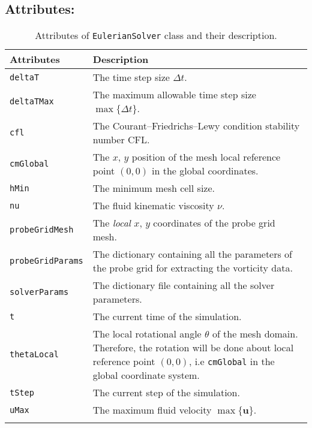 \subsection*{Attributes:}
\begingroup
\footnotesize
\begin{longtable}{|l|p{11cm}|}
	\hline
	\textbf{Attributes} & \textbf{Description}\\
	\toprule
    \texttt{deltaT} 		& The time step size $\Delta t$. \\ \hline
    \texttt{deltaTMax} 		& The maximum allowable time step size $\max\{\Delta t\}$.\\ \hline
    \texttt{cfl} 			& The Courant–Friedrichs–Lewy condition stability number CFL. \\ \hline        
    \texttt{cmGlobal} 		& The $x$, $y$ position of the mesh local reference point $(0,0)$ in the global coordinates. \\ \hline        
    \texttt{hMin} 			& The minimum mesh cell size. \\ \hline        
    \texttt{nu} 			& The fluid kinematic viscosity $\nu$.  \\ \hline        
    \texttt{probeGridMesh} 	& The \textit{local} $x$, $y$ coordinates of the probe grid mesh. \\ \hline            
    \texttt{probeGridParams}& The dictionary containing all the parameters of the probe grid for extracting the vorticity data. \\ \hline            
    \texttt{solverParams} 	& The dictionary file containing all the solver parameters.  \\ \hline                
    \texttt{t} 				& The current time of the simulation. \\ \hline                    
    \texttt{thetaLocal} 	& The local rotational angle $\theta$ of the mesh domain. Therefore, the rotation will be done about local reference  point $(0,0)$, i.e \texttt{cmGlobal} in the global coordinate system.\\ \hline                            
    \texttt{tStep} 			& The current step of the simulation. \\ \hline                    
    \texttt{uMax} 			& The maximum fluid velocity $\max\{\mathbf{u}\}$. \\ \hline
    
    \caption{Attributes of \texttt{EulerianSolver} class and their description.}
    \label{tab:attributeEulerian}
\end{longtable}
\endgroup


